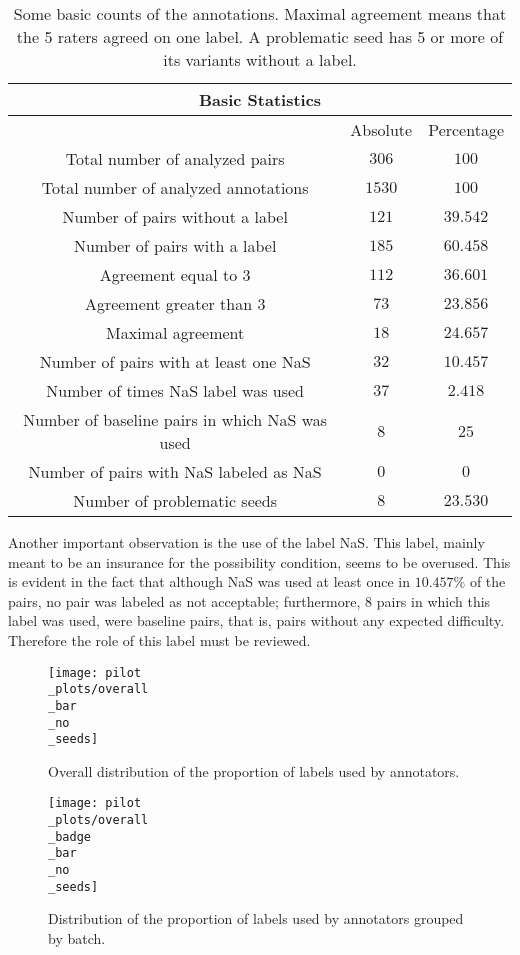 \begin{table}
\centering
\begin{tabular}{|c|c|c|}
\hline
\multicolumn{3}{|c|}{Basic Statistics}\\\hline
  & Absolute & Percentage \\\hline
Total number of analyzed pairs & $306$ & $100$\\\hline
Total number of analyzed annotations & $1530$ & $100$\\\hline
Number of pairs without a label & $121$ & $39.542$\\\hline
Number of pairs with a label & $185$ & $60.458$\\\hline
Agreement equal to 3 & $112$ & $36.601$\\\hline 
Agreement greater than 3 & $73$ & $23.856$\\\hline
Maximal agreement & $18$ & $24.657$\\\hline
Number of pairs with at least one NaS & $32$ & $10.457$\\\hline
Number of times NaS label was used & $37$ & $2.418$\\\hline
Number of baseline pairs in which NaS was used & $8$ & $25$\\\hline
Number of pairs with NaS labeled as NaS & $0$ & $0$\\\hline
Number of problematic seeds & $8$ & $23.530$\\\hline                                                  
\end{tabular}
\caption[Basic counts of the annotations.]{Some basic counts of the annotations. Maximal agreement means that the 5 raters agreed on one label. A problematic seed has 5 or more of its variants without a label.}
\label{tab:pilbasstats}
\end{table}

Another important observation is the use of the label NaS. This label, mainly meant to be an insurance for the possibility condition, seems to be overused. This is evident in the fact that although NaS was used at least once in $10.457\%$ of the pairs, no pair was labeled as not acceptable; furthermore, $8$ pairs in which this label was used, were baseline pairs, that is, pairs without any expected difficulty. Therefore the role of this label must be reviewed.\\ 

\begin{figure}
\centering
\parbox{10cm}{\texttt{[image: pilot\\\_plots/overall\\\_bar\\\_no\\\_seeds]}
\caption[Distribution of labels.]{Overall distribution of the proportion of labels used by annotators.}\label{fig:pilallbar}}
\qquad
\begin{minipage}{10cm}
\texttt{[image: pilot\\\_plots/overall\\\_badge\\\_bar\\\_no\\\_seeds]}
\caption[Distribution of labels by batch.]{Distribution of the proportion of labels used by annotators grouped by batch.}\label{fig:batchbar}
\end{minipage}
\end{figure}


